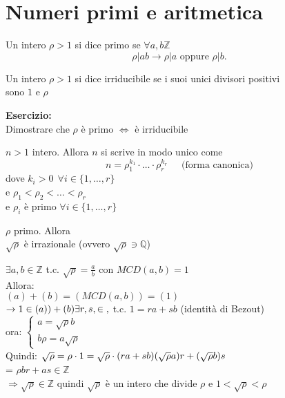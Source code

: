 \documentclass[12px]{article}
\begin{document}
{	\section{Numeri primi e aritmetica}
	\begin{defi}
		Un intero $\rho > 1$ si dice primo se  $\forall a,b\mathbb Z$
		 \[
			 \rho|ab \rightarrow \rho|a \text{ oppure } \rho|b
		.\] 
	\end{defi}
	\begin{defi}
		Un intero $\rho>1$ si dice irriducibile se i suoi unici divisori positivi\\ sono  $1$ e $\rho$
	\end{defi}
	\textbf{Esercizio:}\\
	Dimostrare che $\rho$ è primo $\Leftrightarrow$ è irriducibile
	\begin{teo}
		$n>1$ intero. Allora $n$ si scrive in modo unico come
		\[
			n = \rho_1^{k_1}\cdot\ldots\cdot \rho_r^{k_r} \ \ \ \ \ \text{ (forma canonica)}
		\] 
		dove $k_i>0 \ \ \forall i\in\{1,\ldots,r\}$\\
		e $\rho_1<\rho_2<\ldots<\rho_r$\\
		e $\rho_i$ è primo  $\forall i\in \{1,\ldots,r\}$
	\end{teo}
	\begin{teo}
		$\rho$ primo. Allora\\
		$\sqrt \rho $ è irrazionale (ovvero $\sqrt\rho\ni \mathbb Q$)
	\end{teo}
	\begin{dimo}
		$\exists a, b\in \mathbb Z$ t.c.  $\sqrt\rho = \frac a b$ con $MCD(a,b) = 1$\\
		Allora:\\
		 $(a) + (b) = (MCD(a,b)) = (1)$\\
		  $\rightarrow 1\in (a)) + (b)\\
		  \exists r,s,\in\mathbb,$ t.c. $1 = ra + sb$ (identità di Bezout)\\
		  ora:  $ \begin{cases}
		  	a = \sqrt \rho b \\ b\rho = a\sqrt\rho
		  \end{cases}$ \\
		  Quindi:
		  $\sqrt \rho = \rho\cdot 1 = \sqrt \rho\cdot (ra + sb)\\
		  (\sqrt\rho a)r + (\sqrt\rho b)s$\\
		  =  $\rho b r + as\in \mathbb Z$\\
		   $ \Rightarrow \sqrt\rho\in\mathbb Z$ quindi $\sqrt\rho$ è un intero che divide $\rho$ e $1<\sqrt\rho<\rho$

\end{dimo}}
\end{document}
